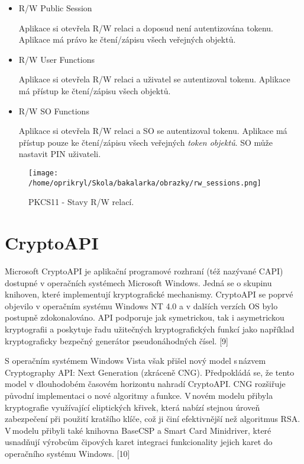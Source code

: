 \documentclass[]{fithesis3}
\begin{document}
		\begin{itemize}
			\item R/W Public Session

			Aplikace si otevřela R/W relaci a doposud není autentizována tokenu. Aplikace má 				právo ke čtení/zápisu všech veřejných objektů.
	
			\item R/W User Functions

			Aplikace si otevřela R/W relaci a uživatel se autentizoval tokenu. Aplikace má přístup 			ke čtení/zápisu všech objektů.

			\item R/W SO Functions

			Aplikace si otevřela R/W relaci a SO se autentizoval tokenu. Aplikace má přístup 					pouze ke čtení/zápisu všech veřejných \textit{token objektů}. SO může nastavit PIN 				uživateli.
		\end{itemize}

		\begin{figure}[!ht]
  			\begin{minipage}{1.00\textwidth}
    				\texttt{[image: /home/oprikryl/Skola/bakalarka/obrazky/rw\_sessions.png]}
  			\end{minipage}
 			\caption{PKCS11 - Stavy R/W relací.}
  			\label{fig:PKCS11 - Stavy R/W relací.}
		\end{figure}	
		
\chapter{CryptoAPI}

Microsoft CryptoAPI je aplikační programové rozhraní (též nazývané CAPI) dostupné v operačních systémech Microsoft Windows. Jedná se o skupinu knihoven, které implementují kryptografické mechanismy. CryptoAPI se poprvé objevilo v operačním systému Windows NT 4.0 a v dalších verzích OS bylo postupně zdokonalováno. API podporuje jak symetrickou, tak i asymetrickou kryptografii a poskytuje řadu užitečných kryptografických funkcí jako například kryptograficky bezpečný generátor pseudonáhodných čísel. [9]

S operačním systémem Windows Vista však přišel nový model s\,názvem Cryptography API: Next Generation (zkráceně CNG). Předpokládá se, že tento model v dlouhodobém časovém horizontu nahradí CryptoAPI. CNG rozšiřuje původní implementaci o nové algoritmy a\,funkce. V\,novém modelu přibyla kryptografie využívající eliptických křivek, která nabízí stejnou úroveň zabezpečení při použití kratšího klíče, což ji činí efektivnější než algoritmus RSA. V\,modelu přibyli také knihovna BaseCSP a Smart Card Minidriver, které usnadňují výrobcům čipových karet integraci funkcionality jejich karet do operačního systému Windows. [10]
\end{document}
